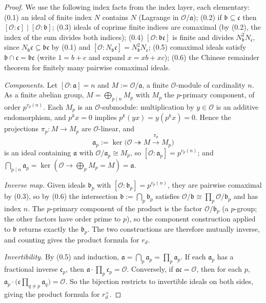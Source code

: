 \begin{proof}
  We use the following index facts from the index layer, each elementary:
  (0.1) an ideal of finite index $N$ contains $N$ (Lagrange in
  $\mathcal{O}/\mathfrak{a}$);
  (0.2) if $\mathfrak{b} \subseteq \mathfrak{c}$ then
  $[\mathcal{O} : \mathfrak{c}] \mid [\mathcal{O} : \mathfrak{b}]$;
  (0.3) ideals of coprime finite indices are comaximal (by (0.2), the index of
  the sum divides both indices);
  (0.4) $[\mathcal{O} : \mathfrak{b}\mathfrak{c}]$ is finite and divides
  $N_{\mathfrak{b}}^2 N_{\mathfrak{c}}$, since
  $N_{\mathfrak{b}}\mathfrak{c} \subseteq \mathfrak{b}\mathfrak{c}$ by (0.1)
  and $[\mathcal{O} : N_{\mathfrak{b}}\mathfrak{c}] =
  N_{\mathfrak{b}}^2 N_{\mathfrak{c}}$;
  (0.5) comaximal ideals satisfy
  $\mathfrak{b} \cap \mathfrak{c} = \mathfrak{b}\mathfrak{c}$
  (write $1 = b + c$ and expand $x = xb + xc$);
  (0.6) the Chinese remainder theorem for finitely many pairwise comaximal
  ideals.

  \emph{Components.} Let $[\mathcal{O} : \mathfrak{a}] = n$ and
  $M := \mathcal{O}/\mathfrak{a}$, a finite $\mathcal{O}$-module of cardinality
  $n$. As a finite abelian group, $M = \bigoplus_{p \mid n} M_p$ with $M_p$ the
  $p$-primary component, of order $p^{v_p(n)}$. Each $M_p$ is an
  $\mathcal{O}$-submodule: multiplication by $y \in \mathcal{O}$ is an additive
  endomorphism, and $p^k x = 0$ implies $p^k(yx) = y(p^k x) = 0$. Hence the
  projections $\pi_p : M \to M_p$ are $\mathcal{O}$-linear, and
  \[
    \mathfrak{a}_p := \ker\bigl(\mathcal{O} \twoheadrightarrow M
      \xrightarrow{\pi_p} M_p\bigr)
  \]
  is an ideal containing $\mathfrak{a}$ with
  $\mathcal{O}/\mathfrak{a}_p \cong M_p$, so
  $[\mathcal{O} : \mathfrak{a}_p] = p^{v_p(n)}$; and
  $\bigcap_{p \mid n} \mathfrak{a}_p = \ker(\mathcal{O} \to \bigoplus_p M_p
  = M) = \mathfrak{a}$.

  \emph{Inverse map.} Given ideals $\mathfrak{b}_p$ with
  $[\mathcal{O} : \mathfrak{b}_p] = p^{v_p(n)}$, they are pairwise comaximal by
  (0.3), so by (0.6) the intersection
  $\mathfrak{b} := \bigcap_p \mathfrak{b}_p$ satisfies
  $\mathcal{O}/\mathfrak{b} \cong \prod_p \mathcal{O}/\mathfrak{b}_p$ and has
  index $n$. The $p$-primary component of the product is the factor
  $\mathcal{O}/\mathfrak{b}_p$ (a $p$-group; the other factors have order prime
  to $p$), so the component construction applied to $\mathfrak{b}$ returns
  exactly the $\mathfrak{b}_p$. The two constructions are therefore mutually
  inverse, and counting gives the product formula for $r_d$.

  \emph{Invertibility.} By (0.5) and induction,
  $\mathfrak{a} = \bigcap_p \mathfrak{a}_p = \prod_p \mathfrak{a}_p$. If each
  $\mathfrak{a}_p$ has a fractional inverse $\mathfrak{c}_p$, then
  $\mathfrak{a} \cdot \prod_p \mathfrak{c}_p = \mathcal{O}$. Conversely, if
  $\mathfrak{a}\mathfrak{c} = \mathcal{O}$, then for each $p$,
  $\mathfrak{a}_p \cdot \bigl(\mathfrak{c}\prod_{q \neq p}
  \mathfrak{a}_q\bigr) = \mathcal{O}$. So the bijection restricts to invertible
  ideals on both sides, giving the product formula for $r_d^{\times}$.
\end{proof}


